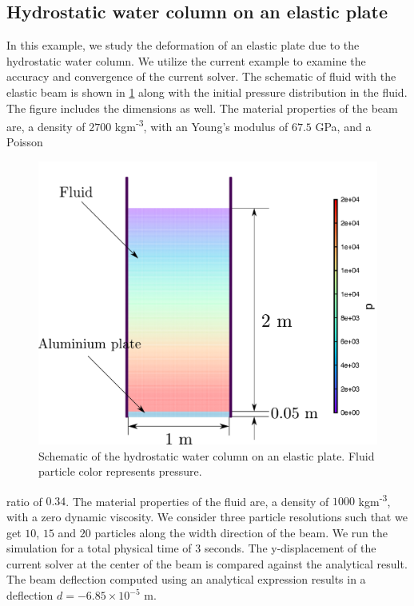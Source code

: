 \subsection{Hydrostatic water column on an elastic plate}
\label{sec:hydrostatic-water-column-on-an-composite-elastic-plate}
In this example, we study the deformation of an elastic plate due to the
hydrostatic water column. We utilize the current example to examine the accuracy
and convergence of the current solver. The schematic of fluid with the elastic
beam is shown in \cref{fig:hs-water-on-plate} along with the initial pressure
distribution in the fluid. The figure includes the dimensions as well. The
material properties of the beam are, a density of $2700$
kgm\textsuperscript{-3}, with an Young's modulus of $67.5$ GPa, and a Poisson
\begin{figure}
  \centering
  \includegraphics[scale=0.4]{images/fsi/images/ng_2020_hydrostatic_water_column_on_elastic_plate/schematic}
  \caption{Schematic of the hydrostatic water column on an elastic plate. Fluid
    particle color represents pressure.}
\label{fig:hs-water-on-plate}
\end{figure}
ratio of $0.34$. The material properties of the fluid are, a density of $1000$
kgm\textsuperscript{-3}, with a zero dynamic viscosity. We consider three particle
resolutions such that we get $10$, $15$ and $20$ particles along the width
direction of the beam. We run the simulation for a total physical time of $3$
seconds. The y-displacement of the current solver at the center of the beam is
compared against the analytical result. The beam deflection computed using
an analytical expression results in a deflection $d = -6.85 \times 10^{-5}$ m.

